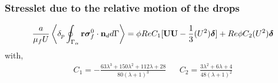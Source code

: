 \documentclass{sintefbeamer}
\begin{document}
\begin{frame}
  \frametitle{Stresslet due to the relative motion of the drops}
  \begin{multline}
    \frac{a}{\mu_f U}
        \left<\delta_p \oint_{\Gamma_{\alpha}} \textbf{r}\bm{\sigma}_f^0 \cdot \textbf{n}_d d\Gamma\right>
    =
     \phi Re C_1
    [
        \textbf{UU} - \frac{1}{3}(U^2)\bm\delta 
    ]
    + Re \phi C_2 (U^2) \bm\delta
    \label{eq:stresslet_trans}
\end{multline} 
with, 
\begin{align}
    C_1  =  -\frac{63 \lambda^{3} + 150 \lambda^{2} + 112 \lambda + 28}{80 \left(\lambda + 1\right)^{3}}
    &&
    C_2  = \frac{3\lambda^2 + 6\lambda + 4}{48(\lambda +1 )^2}
\end{align}

\end{frame}
\end{document}
